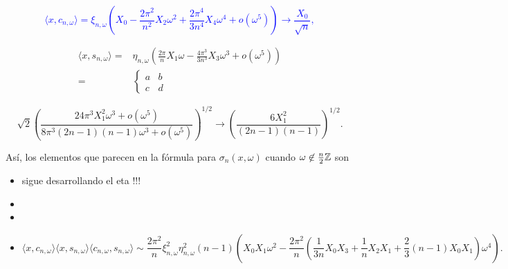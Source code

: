 \textcolor{blue}{
\[
\langle x,
c_{n, \omega}
\rangle = 
\xi_{n, \omega} 
\left(
X_{0} - \frac{2 \pi^{2}}{n^{2}}X_{2} \omega^{2} 
+ \frac{2 \pi^{4}}{3n^{4}} X_{4} \omega^{4} + o(\omega^{5})
\right) \rightarrow \frac{X_{0}}{\sqrt{n}} ,
\]
}


\begin{align*}
\langle x,
s_{n, \omega}
\rangle = &
\eta_{n, \omega} 
\left(
\frac{2 \pi}{n} X_{1} \omega - \frac{4 \pi^{3}}{3n^{3}}X_{3} \omega^{3} 
 + o(\omega^{5})
\right)\\
= &
\begin{cases}
a & b \\
c & d
\end{cases}
\end{align*}

\[
\sqrt{2} \left(
\frac{24 \pi^{3}X_{1}^{2}\omega^{3} + o(\omega^{5}) }{
8 \pi^{3} (2n-1)(n-1)\omega^{3} + o(\omega^{5})
}
\right)^{1/2}
\rightarrow \left(
\frac{6 X_{1}^{2}}{(2n-1)(n-1)}
\right)^{1/2}.
\]



Así, los elementos que parecen en la fórmula
para $\sigma_{n}(x, \omega)$ cuando $\omega \not\in \frac{n}{2} \mathbb{Z}$ son
\begin{itemize}
\item 
{}
sigue desarrollando el eta  !!!
\item
\TODO{
\[
\langle x,
c_{n, \omega}
\rangle^{2} = 
\xi_{n, \omega}^{2}
\left(
X_{0}^{2} - \frac{4 \pi^{2}}{n^{2}}X_{0}X_{2} \omega^{2} 
+ 
\frac{4 \pi^{4}}{n^{4}}
\left(
\frac{1}{3} X_{0}X_{4} + X_{2}^{2}
\right) \omega^{4} 
+ o(\omega^{5})
\right)
\]
}

\item
\TODO{
\[
\langle x,
s_{n, \omega}
\rangle^{2} = 
\frac{4 \pi^{2}}{n^{2}}
\eta_{n, \omega}^{2}
\left(
X_{1}^{2}\omega^{2} - \frac{4 \pi^{2}}{3n^{2}}X_{1}X_{3} \omega^{4} 
+  o(\omega^{5})
\right)
\]
}

\item
\[
\langle
x, c_{n, \omega}
\rangle
\langle
x, s_{n, \omega}
\rangle
\langle
c_{n, \omega}, s_{n, \omega}
\rangle \sim
\frac{2 \pi^{2}}{n}
\xi_{n, \omega}^{2} \eta_{n, \omega}^{2}(n-1)
\left(
X_{0}X_{1}\omega^{2} 
- \frac{2 \pi^{2}}{n}
\left(
\frac{1}{3n} X_{0}X_{3} + \frac{1}{n} X_{2}X_{1}
+ \frac{2}{3}(n-1)X_{0}X_{1}
\right) \omega^{4}
\right).
\]
\end{itemize}

